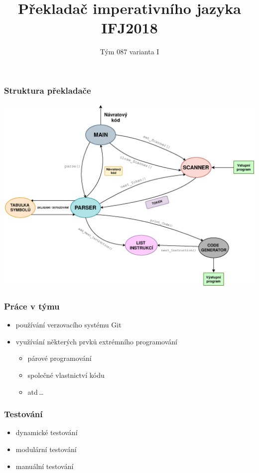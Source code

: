 \documentclass[pdf,hyperref={unicode}]{beamer}
\date{}
\title{Překladač imperativního jazyka IFJ2018}
\author{Tým 087 varianta I}
\institute[VUT FIT]
{
	{\large Vysoké učení technické v Brně} \\[0,4em]
    {\large Fakulta informačních technologií}
}
\begin{document}
\begin{frame}
	\titlepage
\end{frame}

\begin{frame}
\frametitle{Struktura překladače}
\hspace*{-4ex}\includegraphics[scale=0.4]{schema.eps}
\end{frame}


\begin{frame}
\frametitle{Práce v týmu}
	\begin{center}
	\begin{itemize}
	\item používání verzovacího systému Git
	\item využívání  některých prvků extrémního programování
		\begin{itemize}
			\item párové programování
			\item společné vlastnictví kódu
			\item atd\,\dots
		\end{itemize}
	\end{itemize}
	\end{center}
\end{frame}

\begin{frame}
\frametitle{Testování}
	\begin{itemize}
		\item dynamické testování
		\item modulární testování
		\item manuální testování 
	\end{itemize}
\end{frame}
\end{document}
